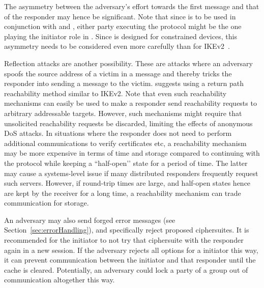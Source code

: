 \documentclass[runningheads]{llncs}
\begin{document}
The asymmetry between the adversary's effort towards the first message and that of the responder may hence be significant.
%
Note that since \mEdhoc{} is to be used in conjunction with \mCoap{} and \mOscore{}, either party executing the \mCoap{} protocol might be the one playing the initiator role in \mEdhoc.
%
Since \mEdhoc{} is designed for constrained devices, this asymmetry needs to be considered even more carefully than for IKEv2~\cite{rfc8019}.


Reflection attacks are another possibility.
%
These are attacks where an adversary spoofs the source address of a victim in a message and thereby tricks the responder into sending a message to the victim.
%
\mEdhoc{} suggests using a return path reachability method similar to IKEv2.
%
Note that even such reachability mechanisms can easily be used to make a responder send reachability requests to arbitrary addressable targets.
%
However, such mechanisms might require that unsolicited reachability requests be discarded, limiting the effects of
anonymous DoS attacks.
%
In situations where the responder does not need to perform additional communications to verify certificates etc, a reachability mechanism may be more expensive in terms of time and storage compared to continuing with the protocol while keeping a ``half-open’’ state for a period of time.
%
The latter may cause a systems-level issue if many distributed \mEdhoc{} responders frequently request such servers.
%
However, if round-trip times are large, and half-open states hence are kept by the receiver for a long time, a reachability mechanism can trade communication for storage.

An adversary may also send forged error messages (see Section~\ref{sec:errorHandling}), and specifically reject proposed ciphersuites.
%
It is recommended for the initiator to not try that ciphersuite with the responder again in a new session.
%
If the adversary rejects all options for a initiator this way, it can prevent
communication between the initiator and that responder until the cache is
cleared.
%
Potentially, an adversary could lock a party of a group out of communication altogether this way.
%

\end{document}
